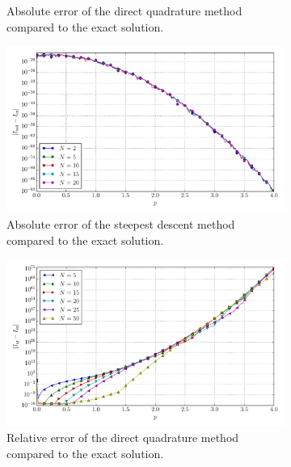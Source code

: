 \documentclass[a4paper,10pt]{article}
\begin{document}
\begin{figure}[ht!]
\begin{subfigure}[t]{0.5\linewidth}
    \caption{Absolute error of the direct quadrature method compared to the exact solution.}
    \label{fig:tp_2d_conv_p_10_01_err_qr}
  \end{subfigure}
  \begin{subfigure}[t]{0.5\linewidth}
    \includegraphics[width=\linewidth]{./plots/tp_2d_conv_p_(1,0)_(0,1)_err_nsd.pdf}
    \caption{Absolute error of the steepest descent method compared to the exact solution.}
    \label{fig:tp_2d_conv_p_10_01_err_nsd}
  \end{subfigure}
  \begin{subfigure}[t]{0.5\linewidth}
    \includegraphics[width=\linewidth]{./plots/tp_2d_conv_p_(1,0)_(0,1)_err_rel_qr.pdf}
    \caption{Relative error of the direct quadrature method compared to the exact solution.}
    \label{fig:tp_2d_conv_p_10_01_err_qr}
  \end{subfigure}
  \begin{subfigure}[t]{0.5\linewidth}

\end{subfigure}
\end{figure}
\end{document}
